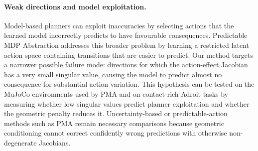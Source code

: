﻿\documentclass{article}
\begin{document}
\paragraph{Weak directions and model exploitation.}
Model-based planners can exploit inaccuracies by selecting actions that the
learned model incorrectly predicts to have favourable consequences.
Predictable MDP Abstraction addresses this broader problem by learning a
restricted latent action space containing transitions that are easier to
predict. Our method targets a narrower possible failure mode: directions for
which the action-effect Jacobian has a very small singular value, causing the
model to predict almost no consequence for substantial action variation.
This hypothesis can be tested on the MuJoCo environments used by PMA and on
contact-rich Adroit tasks by measuring whether low singular values predict
planner exploitation and whether the geometric penalty reduces it.
Uncertainty-based or predictable-action methods such as PMA remain necessary
comparisons because geometric conditioning cannot correct confidently wrong
predictions with otherwise non-degenerate Jacobians. 
\end{document}
